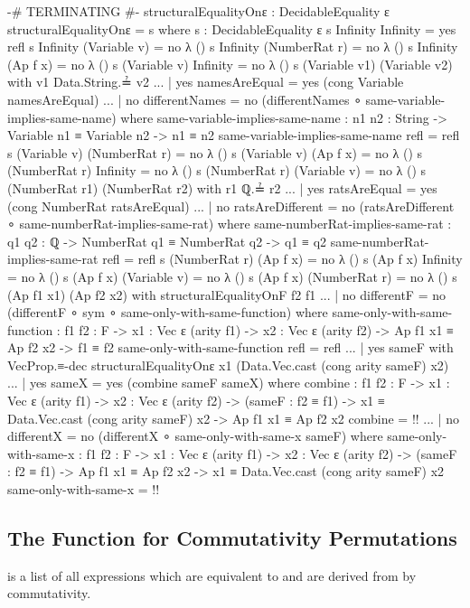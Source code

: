 \documentclass{report}
\begin{document}
\begin{code}
{-# TERMINATING #-}
structuralEqualityOnε : DecidableEquality ε
structuralEqualityOnε = s
  where
  s : DecidableEquality ε
  s Infinity Infinity = yes refl
  s Infinity (Variable v) = no λ ()
  s Infinity (NumberRat r) = no λ ()
  s Infinity (Ap f x) = no λ ()
  s (Variable v) Infinity = no λ ()
  s (Variable v1) (Variable v2) with v1 Data.String.≟ v2
  ... | yes namesAreEqual = yes (cong Variable namesAreEqual)
  ... | no differentNames = no (differentNames ∘ same-variable-implies-same-name)
    where
    same-variable-implies-same-name :
      {n1 n2 : String} ->
      Variable n1 ≡ Variable n2 ->
      n1 ≡ n2
    same-variable-implies-same-name refl = refl
  s (Variable v) (NumberRat r) = no λ ()
  s (Variable v) (Ap f x) = no λ ()
  s (NumberRat r) Infinity = no λ ()
  s (NumberRat r) (Variable v) = no λ ()
  s (NumberRat r1) (NumberRat r2) with r1 ℚ.≟ r2
  ... | yes ratsAreEqual = yes (cong NumberRat ratsAreEqual)
  ... | no ratsAreDifferent = no (ratsAreDifferent ∘ same-numberRat-implies-same-rat)
    where
    same-numberRat-implies-same-rat :
      {q1 q2 : ℚ} ->
      NumberRat q1 ≡ NumberRat q2 ->
      q1 ≡ q2
    same-numberRat-implies-same-rat refl = refl
  s (NumberRat r) (Ap f x) = no λ ()
  s (Ap f x) Infinity = no λ ()
  s (Ap f x) (Variable v) = no λ ()
  s (Ap f x) (NumberRat r) = no λ ()
  s (Ap f1 x1) (Ap f2 x2) with structuralEqualityOnF f2 f1
  ... | no differentF = no (differentF ∘ sym ∘ same-only-with-same-function)
    where
    same-only-with-same-function :
      {f1 f2 : F} ->
      {x1 : Vec ε (arity f1)} ->
      {x2 : Vec ε (arity f2)} ->
      Ap f1 x1 ≡ Ap f2 x2 ->
      f1 ≡ f2
    same-only-with-same-function refl = refl
  ... | yes sameF with VecProp.≡-dec structuralEqualityOnε
                                     x1 (Data.Vec.cast (cong arity sameF) x2)
  ... | yes sameX = yes (combine sameF sameX)
    where
    combine :
      {f1 f2 : F} ->
      {x1 : Vec ε (arity f1)} ->
      {x2 : Vec ε (arity f2)} ->
      (sameF : f2 ≡ f1) ->
      x1 ≡ Data.Vec.cast (cong arity sameF) x2 ->
      Ap f1 x1 ≡ Ap f2 x2
    combine = {!!}
  ... | no differentX = no (differentX ∘ same-only-with-same-x sameF)
    where
    same-only-with-same-x :
      {f1 f2 : F} ->
      {x1 : Vec ε (arity f1)} ->
      {x2 : Vec ε (arity f2)} ->
      (sameF : f2 ≡ f1) ->
      Ap f1 x1 ≡ Ap f2 x2 ->
      x1 ≡ Data.Vec.cast (cong arity sameF) x2
    same-only-with-same-x = {!!}
\end{code}

\subsection{The Function for Commutativity Permutations}
  is a list of all expressions which are equivalent to  and are derived from  by commutativity.
\end{document}
